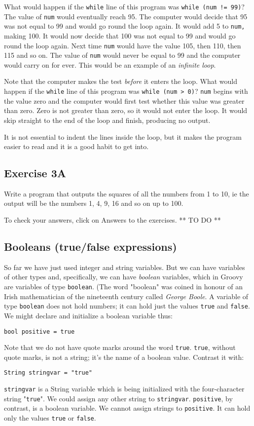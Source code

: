 What would happen if the \texttt{while} line of this program was
\texttt{while (num != 99)}?
The value of \texttt{num} would eventually reach 95.  The computer would
decide that 95 was not equal to 99 and would go round the loop again.
It would add 5 to \texttt{num,} making 100.
It would now decide that 100 was not equal to 99 and would go round the
loop again.  Next time \texttt{num} would have the value 105, then 110,
then 115 and so on.  The value of \texttt{num} would never be equal to 99
and the computer would carry on for ever.  This would be an example of
an \emph{infinite loop}.

Note that the computer makes the test \emph{before} it enters the loop.
What would happen if the \texttt{while} line of this program was
\texttt{while (num > 0)}?   \texttt{num} begins with the value zero and the computer would first
test whether this value was greater than zero.  Zero is not greater than
zero, so it would not enter the loop.  It would skip straight to the end
of the loop and finish, producing no output.

It is not essential to indent the lines inside the loop, but it makes the
program easier to read and it is a good habit to get into.

\subsection*{Exercise 3A}

Write a program that outputs the squares of all the numbers
from 1 to 10, ie the output will be the numbers 1, 4, 9, 16 and so on up to
100.

To check your answers, click on  Answers to the exercises. ** TO DO **

\subsection{Booleans (true/false expressions)}

So far we have just used integer and string variables.  But we can have variables of
other types and, specifically, we can have \emph{boolean} variables, which in
Groovy are variables of type \texttt{boolean}.  (The word "boolean" was coined
in honour of an Irish mathematician of the nineteenth century called
\emph{George Boole}.  A variable of type \texttt{boolean} does not
hold numbers; it can hold just the values \texttt{true} and \texttt{false}.  We might
declare and initialize a boolean variable thus:
\begin{Verbatim}
bool positive = true
\end{Verbatim}
Note that we do not have quote marks around the word \texttt{true}.  
\texttt{true}, without quote marks, is not a string; it's the name of a
boolean value.  Contrast it with:
\begin{Verbatim}
String stringvar = "true"
\end{Verbatim}
\texttt{stringvar} is a String variable which is being initialized with the
four-character string "\texttt{true}".  We could assign any other string
to \texttt{stringvar}.  \texttt{positive}, by contrast, is a boolean variable.
We cannot assign strings to \texttt{positive}.  It can hold only the values
\texttt{true} or \texttt{false}.

